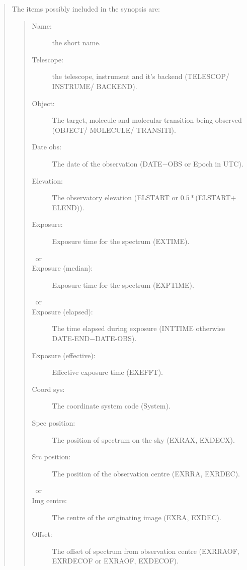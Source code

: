 \documentclass[twoside,11pt]{article}
\renewcommand{\_}{\texttt{\symbol{95}}}
\begin{document}
\begin{quote}
\begin{itemize}
  The items possibly included in the synopsis are:
  \begin{quote}
  \begin{description}
     \item[Name:] the short name.
     \item[Telescope:] the telescope, instrument and it's backend (TELESCOP/ INSTRUME/ BACKEND).
     \item[Object:] The target, molecule and molecular transition being observed (OBJECT/ MOLECULE/ TRANSITI).
     \item[Date obs:] The date of the observation (DATE$-$OBS or Epoch in UTC).
     \item[Elevation:] The observatory elevation (ELSTART or $0.5*$(ELSTART$+$ELEND)).
     \item[Exposure:] Exposure time for the spectrum (EXTIME).
     \item[~or]
     \item[Exposure (median):] Exposure time for the spectrum (EXP\_TIME).
     \item[~or]
     \item[Exposure (elapsed):] The time elapsed during exposure (INT\_TIME otherwise DATE-END$-$DATE-OBS).
     \item[Exposure (effective):] Effective exposure time (EXEFFT).
     \item[Coord sys:] The coordinate system code (System).

     \item[Spec position:] The position of spectrum on the sky (EXRAX, EXDECX).
     \item[Src position:] The position of the observation centre (EXRRA, EXRDEC).
     \item[~or]
     \item[Img centre:] The centre of the originating image (EXRA, EXDEC).
     \item[Offset:] The offset of spectrum from observation centre (EXRRAOF, EXRDECOF or EXRAOF, EXDECOF).


\end{description}
\end{quote}
\end{itemize}
\end{quote}
\end{document}
